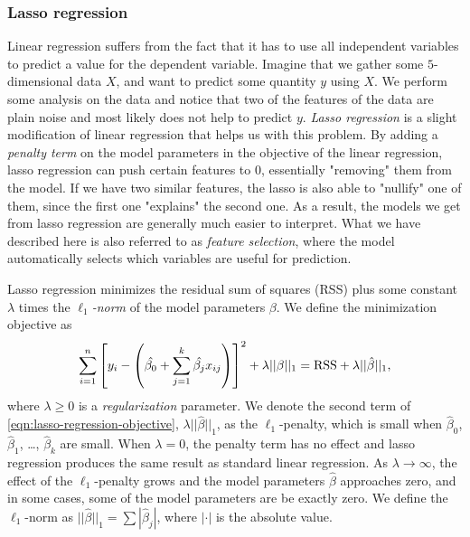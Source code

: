 \subsubsection{Lasso regression}
\label{sec:lasso-regression}
Linear regression suffers from the fact that it has to use all independent variables to predict a value for the dependent variable. Imagine that we gather some $5$-dimensional data $X$, and want to predict some quantity $y$ using $X$. We perform some analysis on the data and notice that two of the features of the data are plain noise and most likely does not help to predict $y$. \textit{Lasso regression} is a slight modification of linear regression that helps us with this problem. By adding a \textit{penalty term} on the model parameters in the objective of the linear regression, lasso regression can push certain features to 0, essentially "removing" them from the model. If we have two similar features, the lasso is also able to "nullify" one of them, since the first one "explains" the second one. As a result, the models we get from lasso regression are generally much easier to interpret. What we have described here is also referred to as \textit{feature selection}, where the model automatically selects which variables are useful for prediction.

Lasso regression minimizes the residual sum of squares (RSS) plus some constant $\lambda$ times the \textit{$\ell_1$-norm} of the model parameters $\beta$. We define the minimization objective as
\begin{align}
    \sum\limits_{i=1}^{n}{\left[y_i - \left(\hat{\beta_0} +  \sum\limits_{j=1}^{k}{\hat{\beta_j}x_{ij}}\right)\right]^2} + \lambda ||\beta||_1 = \text{RSS} + \lambda ||\hat{\beta}||_1,
    \label{eqn:lasso-regression-objective}
\end{align}
where $\lambda \geq 0$ is a \textit{regularization} parameter. We denote the second term of \cref{eqn:lasso-regression-objective}, $\lambda ||\hat{\beta}||_1$, as the $\ell_1$-penalty, which is small when $\hat{\beta}_0$, $\hat{\beta}_1$, \ldots, $\hat{\beta}_k$ are small. When $\lambda = 0$, the penalty term has no effect and lasso regression produces the same result as standard linear regression. As $\lambda \rightarrow \infty$, the effect of the $\ell_1$-penalty grows and the model parameters $\hat{\beta}$ approaches zero, and in some cases, some of the model parameters are be exactly zero. We define the $\ell_1$-norm as $||\hat{\beta}||_1 = \sum |\hat{\beta}_j|$, where $|\cdot|$ is the absolute value.

